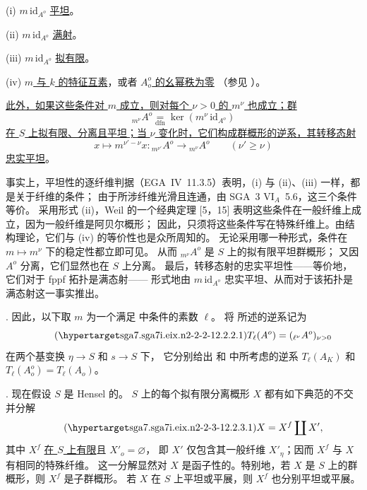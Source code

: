 \smallskip
\noindent
(i) $m\,\mathrm{id}_{A^o}$ \underline{平坦}。

\noindent
(ii) $m\,\mathrm{id}_{A^o}$ \underline{满射}。

\noindent
(iii) $m\,\mathrm{id}_{A^o}$ \underline{拟有限}。

\noindent
(iv) \underline{$m$ 与 $k$ 的特征互素}，或者 \underline{$A_o^o$ 的幺幂秩为零}
（参见 ）。

\smallskip
\noindent
\underline{此外，如果这些条件对 $m$ 成立，则对每个 $\nu>0$ 的 $m^\nu$ 也成立；群}
\[
 {}_{m^\nu}A^o\underset{\mathrm{dfn}}{=}
 \ker(m^\nu\,\mathrm{id}_{A^o})
\]
\underline{在 $S$ 上拟有限、分离且平坦；当 $\nu$ 变化时，它们构成群概形的逆系，其转移态射}
\[
 x\longmapsto m^{\nu'-\nu}x:
 {}_{m^{\nu'}}A^o\longrightarrow{}_{m^\nu}A^o
 \qquad(\nu'\geq\nu)
\]
\underline{忠实平坦}。

事实上，平坦性的逐纤维判据（EGA~IV~11.3.5）表明，(i) 与 (ii)、(iii) 一样，都是关于纤维的条件；
由于所涉纤维光滑且连通，由 SGA~3 $\mathrm{VI}_A$~5.6，这三个条件等价。
采用形式 (ii)，Weil 的一个经典定理 [5，15] 表明这些条件在一般纤维上成立，因为一般纤维是阿贝尔概形；
因此，只须将这些条件写在特殊纤维上。由结构理论，它们与 (iv) 的等价性也是众所周知的。
无论采用哪一种形式，条件在 $m\mapsto m^\nu$ 下的稳定性都立即可见。
从而 ${}_{m^\nu}A^o$ 是 $S$ 上的拟有限平坦群概形；
又因 $A^o$ 分离，它们显然也在 $S$ 上分离。
最后，转移态射的忠实平坦性——等价地，它们对于 fppf 拓扑是满态射——
形式地由 $m\,\mathrm{id}_{A^o}$ 忠实平坦、从而对于该拓扑是满态射这一事实推出。

\medskip
\noindent
{}. 因此，以下取 $m$ 为一个满足  中条件的素数 $\ell$。
将  所述的逆系记为
\begin{equation}\tag{\SGARefTarget{sga7.sga7i.eix.n2-2-2-1}{2.2.2.1}}
 T_\ell(A^o)=({}_{\ell^\nu}A^o)_{\nu>0}
\end{equation}
在两个基变换 $\eta\longrightarrow S$ 和 $s\longrightarrow S$ 下，
它分别给出  和  中所考虑的逆系
$T_\ell(A_K)$ 和 $T_\ell(A_o^o)=T_\ell(A_o)$。

\medskip
\noindent
{}. 现在假设 $S$ 是 Hensel 的。
$S$ 上的每个拟有限分离概形 $X$ 都有如下典范的不交并分解
\begin{equation}\tag{\SGARefTarget{sga7.sga7i.eix.n2-2-3-1}{2.2.3.1}}
 X=X^f\coprod X',
\end{equation}
其中 $X^f$ \underline{在 $S$ 上有限}且 $X'_o=\varnothing$，
即 $X'$ 仅包含其一般纤维 $X'_\eta$；因而 $X^f$ 与 $X$ 有相同的特殊纤维。
这一分解显然对 $X$ 是函子性的。特别地，若 $X$ 是 $S$ 上的群概形，则 $X^f$ 是子群概形。
若 $X$ 在 $S$ 上平坦或平展，则 $X^f$ 也分别平坦或平展。

